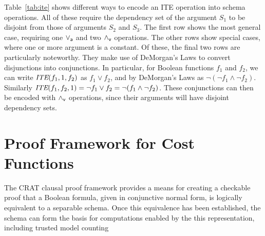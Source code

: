 \documentclass{llncs}
\newcommand{\pand}{\mathbin{\land_{\sf v}}}
\newcommand{\por}{\mathbin{\lor_{\sf a}}}
\newcommand{\tautology}{1}
\newcommand{\ite}{\mbox{\it ITE}}
\begin{document}
Table~\ref{tab:ite} shows different ways to encode an ITE operation
into schema operations.  All of these require the dependency set of
the argument $S_1$ to be disjoint from those of arguments $S_2$ and
$S_3$.  The first row shows the most general case, requiring one
$\por$ and two $\pand$ operations.  The other rows show special cases,
where one or more argument is a constant.  Of these, the final two
rows are particularly noteworthy.  They make use of DeMorgan's Laws to
convert disjunctions into conjunctions.  In particular, for Boolean
functions $f_1$ and $f_2$, we can write $\ite(f_1, \tautology, f_2)$
as $f_1 \lor f_2$, and by DeMorgan's Laws as $\neg(\neg f_1 \land
\neg f_2)$.  Similarly $\ite(f_1, f_2, \tautology) = \neg f_1 \lor f_2 = \neg(f_1 \land \neg f_2)$.
These conjunctions can then be
encoded with $\pand$ operations, since their arguments will have
disjoint dependency sets.

\section{Proof Framework for Cost Functions}

The CRAT clausal proof framework provides a means for creating a
checkable proof that a Boolean formula, given in conjunctive normal
form, is logically equivalent to a separable schema.  Once this
equivalence has been established, the schema can form the basis
for computations enabled by the
this representation, including trusted model counting 
\end{document}
